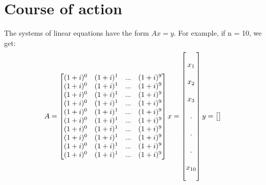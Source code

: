 \documentclass[11pt, a4paper, titlepage, openright]{article}
\begin{document}
\section{Course of action}
    The systems of linear equations have the form \(Ax = y\).
    For example, if n = 10, we get:
    \[
        A =
        \begin{bmatrix}
            (1+i)^{0} & (1+i)^{1} & ... & (1+i)^{9} \\
            (1+i)^{0} & (1+i)^{1} & ... & (1+i)^{9} \\
            (1+i)^{0} & (1+i)^{1} & ... & (1+i)^{9} \\
            (1+i)^{0} & (1+i)^{1} & ... & (1+i)^{9} \\
            (1+i)^{0} & (1+i)^{1} & ... & (1+i)^{9} \\
            (1+i)^{0} & (1+i)^{1} & ... & (1+i)^{9} \\
            (1+i)^{0} & (1+i)^{1} & ... & (1+i)^{9} \\
            (1+i)^{0} & (1+i)^{1} & ... & (1+i)^{9} \\
            (1+i)^{0} & (1+i)^{1} & ... & (1+i)^{9} \\
            (1+i)^{0} & (1+i)^{1} & ... & (1+i)^{9} \\
        \end{bmatrix}
        x =
        \begin{bmatrix}
            \\
            x_{1} \\\\
            x_{2} \\\\
            x_{3} \\\\
            . \\\\
            . \\\\
            . \\\\
            x_{10} \\\\
        \end{bmatrix}
        \\
        y =
        \begin{bmatrix}
            \\

\end{bmatrix}\]
\end{document}
